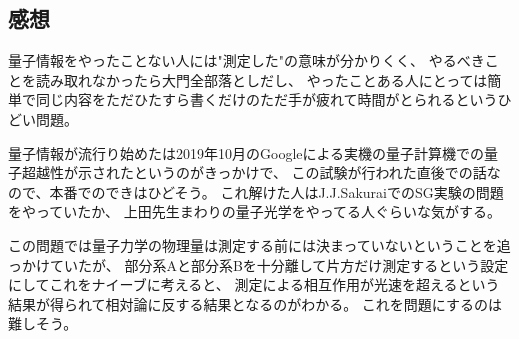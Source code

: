 \documentclass[../../sp_2019.tex]{subfiles}
\begin{document}
\subsection*{感想}
量子情報をやったことない人には"測定した"の意味が分かりくく、
やるべきことを読み取れなかったら大門全部落としだし、
やったことある人にとっては簡単で同じ内容をただひたすら書くだけのただ手が疲れて時間がとられるというひどい問題。

量子情報が流行り始めたは2019年10月のGoogleによる実機の量子計算機での量子超越性が示されたというのがきっかけで、
この試験が行われた直後での話なので、本番でのできはひどそう。
これ解けた人はJ.J.SakuraiでのSG実験の問題をやっていたか、
上田先生まわりの量子光学をやってる人ぐらいな気がする。

この問題では量子力学の物理量は測定する前には決まっていないということを追っかけていたが、
部分系Aと部分系Bを十分離して片方だけ測定するという設定にしてこれをナイーブに考えると、
測定による相互作用が光速を超えるという結果が得られて相対論に反する結果となるのがわかる。
これを問題にするのは難しそう。
\end{document}
